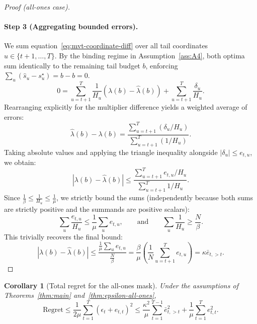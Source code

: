 \documentclass[11pt]{article}
\newtheorem{corollary}{Corollary}[section]
\newcommand{\1}{\mathbf{1}}
\begin{document}
\begin{proof}[Proof (all-ones case)]
  \paragraph{Step 3 (Aggregating bounded errors).}
  We sum equation~\eqref{eq:mvt-coordinate-diff} over all tail coordinates $u \in \{t+1,\dots,T\}$.
  By the binding regime in Assumption~\ref{ass:A4}, both optima sum identically to the remaining tail budget $b$, enforcing $\sum_u (\hat{s}_u - s_u^{\star}) = b - b = 0$.
  \begin{equation*}
    0 = \sum_{u=t+1}^{T} \frac{1}{H_u} (\lambda(b) - \hat{\lambda}(b)) + \sum_{u=t+1}^{T} \frac{\delta_u}{H_u}.
  \end{equation*}
  Rearranging explicitly for the multiplier difference yields a weighted average of errors:
  \begin{equation*}
    \hat{\lambda}(b) - \lambda(b) = \frac{\sum_{u=t+1}^{T} (\delta_u / H_u)}{\sum_{u=t+1}^{T} (1 / H_u)}.
  \end{equation*}
  Taking absolute values and applying the triangle inequality alongside $|\delta_u| \leq e_{t,u}$, we obtain:
  \begin{equation*}
    |\lambda(b) - \hat{\lambda}(b)| \leq \frac{\sum_{u=t+1}^{T} e_{t,u} / H_u}{\sum_{u=t+1}^{T} 1 / H_u}.
  \end{equation*}
  Since $\frac{1}{\beta} \leq \frac{1}{H_u} \leq \frac{1}{\mu}$, we strictly bound the sums (independently because both sums are strictly positive and the summands are positive scalars):
  \begin{equation*}
    \sum_u \frac{e_{t,u}}{H_u} \leq \frac{1}{\mu} \sum_u e_{t,u}, \qquad \text{and} \qquad \sum_u \frac{1}{H_u} \geq \frac{N}{\beta}.
  \end{equation*}
  This trivially recovers the final bound:
  \begin{equation*}
    |\lambda(b) - \hat{\lambda}(b)| \leq \frac{\frac{1}{\mu} \sum_u e_{t,u}}{\frac{N}{\beta}} = \frac{\beta}{\mu} \left(\frac{1}{N} \sum_{u=t+1}^{T} e_{t,u}\right) = \kappa \bar{e}_{t, >t}.
  \end{equation*}
  \qedhere
\end{proof}

\begin{corollary}[Total regret for the all-ones mask]
  \label{cor:regret-all-ones}%
  Under the assumptions of Theorems~\ref{thm:main} and~\ref{thm:epsilon-all-ones},
  \begin{equation}
    \label{eq:regret-all-ones}
    \mathrm{Regret}
    \leq \frac{1}{2\mu}\sum_{t=1}^{T} (\epsilon_t+e_{t,t})^2
    \leq \frac{\kappa^2}{\mu}\sum_{t=1}^{T-1} \bar{e}_{t,>t}^{2} + \frac{1}{\mu}\sum_{t=1}^{T} e_{t,t}^2.
  \end{equation}
\end{corollary}
\end{document}
